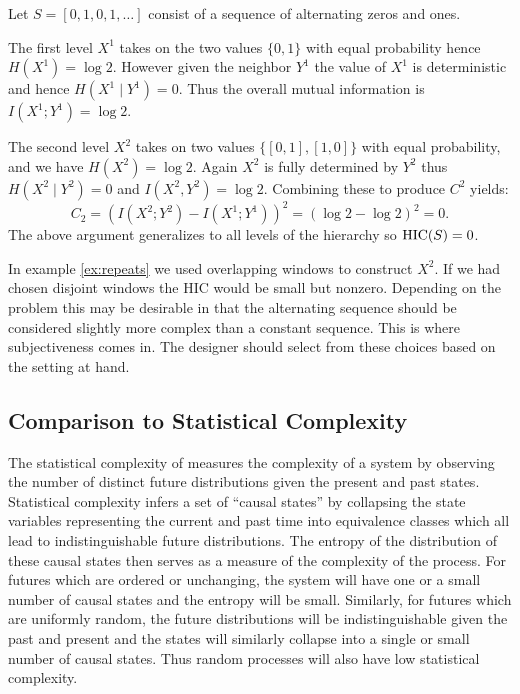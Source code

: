 \begin{example}
  \label{ex:repeats}
  Let $S = [0, 1, 0, 1, \ldots]$ consist of a sequence of alternating zeros and
  ones.

  The first level $X^1$ takes on the two values $\{0, 1\}$ with equal
  probability hence $H(X^1) = \log 2$. However given the neighbor $Y^1$ the
  value of $X^1$ is deterministic and hence $H(X^1 \mid Y^1) = 0$. Thus the
  overall mutual information is $I(X^1; Y^1) = \log 2$.

  The second level $X^2$ takes on two values $\{[0, 1], [1, 0]\}$ with
  equal probability, and we have $H(X^2) = \log 2$. Again $X^2$ is fully
  determined by $Y^2$ thus $H(X^2 \mid Y^2) = 0$ and $I(X^2, Y^2) = \log 2$.
  Combining these to produce $C^2$ yields:
  \begin{equation}
    C_2 = (I(X^2; Y^2) - I(X^1; Y^1))^2 = (\log 2 - \log 2)^2 = 0.
  \end{equation}
  The above argument generalizes to all levels of the hierarchy so $\textup{HIC}(S) = 0$.
\end{example}

In example \ref{ex:repeats} we used overlapping windows to construct $X^2$. If
we had chosen disjoint windows the HIC would be small but nonzero. Depending on
the problem this may be desirable in that the alternating sequence should be
considered slightly more complex than a constant sequence. This is where
subjectiveness comes in. The designer should select from these choices
based on the setting at hand.

\subsection{Comparison to Statistical Complexity}
\label{statistical_complexity}

The statistical complexity of \citet{crutchfield1989inferring} measures the
complexity of a system by observing the number of distinct future distributions
given the present and past states.  Statistical complexity infers a set of
``causal states'' by collapsing the state variables representing the current
and past time into equivalence classes which all lead to indistinguishable
future distributions. The entropy of the distribution of these causal states
then serves as a measure of the complexity of the process. For futures which
are ordered or unchanging, the system will have one or a small number of causal
states and the entropy will be small. Similarly, for futures which are
uniformly random, the future distributions will be indistinguishable given the
past and present and the states will similarly collapse into a single or small
number of causal states. Thus random processes will also have low statistical
complexity.

